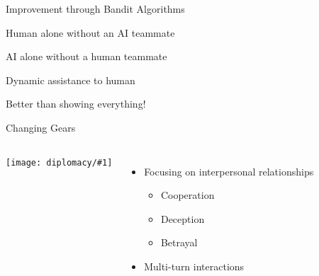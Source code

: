 \documentclass[compress]{beamer}
\newcommand{\fsi}[2]{
\begin{frame}[plain]
\vspace*{-1pt}
\makebox[\linewidth]{\texttt{[image: \#1]}}
\begin{center}
#2
\end{center}
\end{frame}
}
\newcommand{\gfxd}[2]{
	\begin{center}
		\texttt{[image: diplomacy/\#1]}
	\end{center}
}
\newcommand{\gfxq}[2]{
\begin{center}
	\texttt{[image: qb/\#1]}
\end{center}
}
\newif\ifdiplomacy\diplomacytrue
\begin{document}
\begin{frame}{Improvement through Bandit Algorithms}
	
	\only<1>{\gfxq{rl_centaur_2}{.9}}
	\only<2>{\gfxq{rl_centaur_3}{.9}}
	\only<3>{\gfxq{rl_centaur_4}{.9}}
	\only<4>{\gfxq{rl_centaur_5}{.9}}
	\only<5>{\gfxq{rl_centaur_6}{.9}}
	
\end{frame}

\fsi{qb/augment/bandit_result_none}{Human alone without an AI teammate}
\fsi{qb/augment/bandit_result_ai}{AI alone without a human teammate}
\fsi{qb/augment/bandit_result_dynamic}{Dynamic assistance to human}
\fsi{qb/augment/everything}{Better than showing everything!}

\ifdiplomacy    

\begin{frame}{Changing Gears}
	
	\begin{columns}
		
		\gfxd{cicero_science}{1.0}
		\begin{itemize}
			\item Focusing on interpersonal relationships
			\begin{itemize}
				\item Cooperation
				\item Deception
				\item Betrayal
			\end{itemize}
			\item Multi-turn interactions
		\end{itemize}
		
	\end{columns}
	
	
\end{frame}
\end{document}
